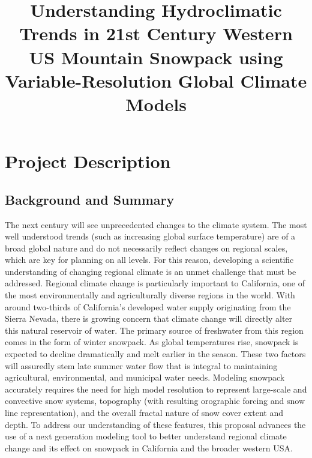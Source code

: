 \documentclass[11pt]{article}
\title{\textbf{Understanding Hydroclimatic Trends in 21st Century Western US Mountain Snowpack using Variable-Resolution Global Climate Models}}
\date{ }
\begin{document}
\maketitle


\section{Project Description}
\subsection{Background and Summary}
The next century will see unprecedented changes to the climate system. The most well understood trends (such as increasing global surface temperature) are of a broad global nature and do not necessarily reflect changes on regional scales, which are key for planning on all levels. For this reason, developing a scientific understanding of changing regional climate is an unmet challenge that must be addressed. Regional climate change is particularly important to California, one of the most environmentally and agriculturally diverse regions in the world. With around two-thirds of California's developed water supply originating from the Sierra Nevada, there is growing concern that climate change will directly alter this natural reservoir of water.  The primary source of freshwater from this region comes in the form of winter snowpack.  As global temperatures rise, snowpack is expected to decline dramatically and melt earlier in the season.  These two factors will assuredly stem late summer water flow that is integral to maintaining agricultural, environmental, and municipal water needs.  Modeling snowpack accurately requires the need for high model resolution to represent large-scale and convective snow systems, topography (with resulting orographic forcing and snow line representation), and the overall fractal nature of snow cover extent and depth. To address our understanding of these features, this proposal advances the use of a next generation modeling tool to better understand regional climate change and its effect on snowpack in California and the broader western USA.
\\\\
\end{document}

